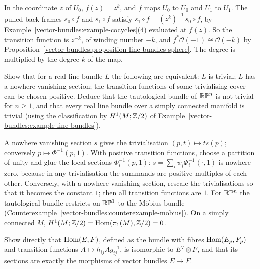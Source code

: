 \begin{solution}
In the coordinate $z$ of $U_0$, $f(z) = z^k$, and $f$ maps $U_0$ to $U_0$ and $U_1$ to $U_1$. The pulled back frames $s_0 \circ f$ and $s_1 \circ f$ satisfy
$s_1 \circ f = (z^k)^{-1}\,s_0 \circ f$, by Example~\ref{vector-bundles:example-cocycles}(4) evaluated at $f(z)$. So the transition function is $z^{-k}$, of winding number $-k$, and
$f^*\mathcal{O}(-1) \cong \mathcal{O}(-k)$ by Proposition~\ref{vector-bundles:proposition-line-bundles-sphere}. The degree is multiplied by the degree $k$ of the map.
\end{solution}

\begin{exercise}\label{vector-bundles:exercise-real-line-bundles}
Show that for a real line bundle $L$ the following are equivalent: $L$ is trivial; $L$ has a nowhere vanishing section; the transition functions of some trivialising cover can be
chosen positive. Deduce that the tautological bundle of $\mathbb{R}\mathbb{P}^n$ is not trivial for $n \geq 1$, and that every real line bundle over a simply connected manifold is trivial (using
the classification by $H^1(M; \mathbb{Z}/2)$ of Example~\ref{vector-bundles:example-line-bundles}).
\end{exercise}

\begin{solution}
A nowhere vanishing section $s$ gives the trivialisation $(p, t) \mapsto ts(p)$; conversely $p \mapsto \Phi^{-1}(p, 1)$. With positive transition functions, choose a partition of unity
and glue the local sections $\Phi_i^{-1}(p, 1)$: $s = \sum_i\psi_i\Phi_i^{-1}(\cdot, 1)$ is nowhere zero, because in any trivialisation the summands are positive multiples of each other.
Conversely, with a nowhere vanishing section, rescale the trivialisations so that it becomes the constant $1$; then all transition functions are $1$. For $\mathbb{R}\mathbb{P}^n$ the tautological bundle
restricts on $\mathbb{R}\mathbb{P}^1$ to the M\"obius bundle (Counterexample~\ref{vector-bundles:counterexample-mobius}). On a simply connected $M$, $H^1(M; \mathbb{Z}/2) = \operatorname{Hom}(\pi_1(M), \mathbb{Z}/2) = 0$.
\end{solution}

\begin{exercise}\label{vector-bundles:exercise-hom-cocycle}
Show directly that $\operatorname{Hom}(E, F)$, defined as the bundle with fibres $\operatorname{Hom}(E_p, F_p)$ and transition functions $A \mapsto h_{ij}Ag_{ij}^{-1}$, is isomorphic to $E^\vee \otimes F$, and that its sections
are exactly the morphisms of vector bundles $E \to F$.
\end{exercise}

